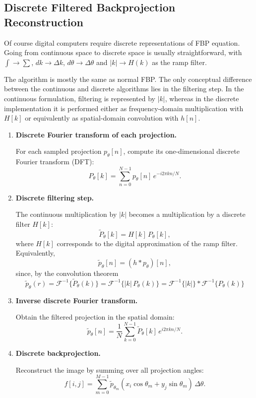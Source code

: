 \documentclass[../../../main.tex]{subfiles}
\begin{document}
\subsection{Discrete Filtered Backprojection Reconstruction}
Of course digital computers require discrete representations of FBP equation.
Going from continuous space to discrete space is usually straightforward, with $\int \rightarrow \sum $, $dk\rightarrow\Delta k$, $d\theta\rightarrow\Delta \theta$ and $|k|\rightarrow H(k)$ as the ramp filter.

The algorithm is mostly the same as normal FBP.
The only conceptual difference between the continuous and discrete algorithms lies in the filtering step.
In the continuous formulation, filtering is represented by $|k|$,  whereas in the discrete implementation it is performed either as frequency-domain multiplication with $H[k]$ or equivalently as spatial-domain convolution with $h[n]$.
\begin{enumerate}
    \item \textbf{Discrete Fourier transform of each projection.}

          For each sampled projection $p_\theta[n]$, compute its one-dimensional discrete Fourier transform (DFT):
          \[
              P_\theta[k] = \sum_{n=0}^{N-1} p_\theta[n]\, e^{-i 2\pi kn / N}.
          \]

    \item \textbf{Discrete filtering step.}

          The continuous multiplication by $|k|$ becomes a multiplication by a discrete filter $H[k]$:
          \[
              \tilde{P}_\theta[k] = H[k]\, P_\theta[k],
          \]
          where $H[k]$ corresponds to the digital approximation of the ramp filter.
          Equivalently,
          \[
              \tilde{p}_\theta[n] = (h * p_\theta)[n],
          \]
          since, by the convolution theorem
          \[
              \tilde{p}_{\theta}(r)
              = \mathcal{F}^{-1}\{\tilde{P}_{\theta}(k)\}
              = \mathcal{F}^{-1}\{|k|\,P_{\theta}(k)\}
              = \mathcal{F}^{-1}\{|k|\} * \mathcal{F}^{-1}\{P_{\theta}(k)\}
          \]

    \item \textbf{Inverse discrete Fourier transform.}

          Obtain the filtered projection in the spatial domain:
          \[
              \tilde{p}_\theta[n] = \frac{1}{N} \sum_{k=0}^{N-1} \tilde{P}_\theta[k]\, e^{i 2\pi kn / N}.
          \]

    \item \textbf{Discrete backprojection.}

          Reconstruct the image by summing over all projection angles:
          \[
              f[i,j] = \sum_{m=0}^{M-1} \tilde{p}_{\theta_m}(x_i\cos\theta_m + y_j\sin\theta_m)\, \Delta\theta.
          \]
\end{enumerate}
\end{document}
